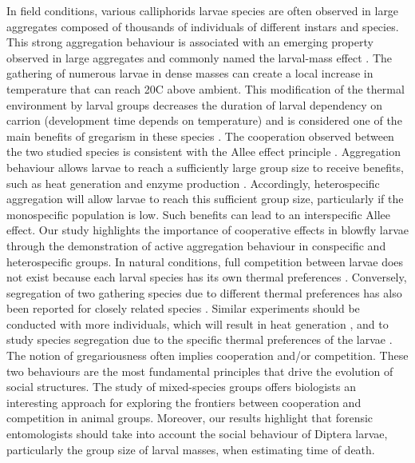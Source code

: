 In field conditions, various calliphorids larvae species are often observed in large aggregates composed of thousands of individuals of different instars and species. This strong aggregation behaviour is associated with an emerging property observed in large aggregates and commonly named the larval-mass effect \citep{charabidze_larval-mass_2011,slone_thermoregulation_2007}. The gathering of numerous larvae in dense masses can create a local increase in temperature that can reach 20C above ambient. This modification of the thermal environment by larval groups decreases the duration of larval dependency on carrion (development time depends on temperature) and is considered one of the main benefits of gregarism in these species \cite{rivers_physiological_2011}. The cooperation observed between the two studied species is consistent with the Allee effect principle \cite{courchamp_allee_2008}. Aggregation behaviour allows larvae to reach a sufficiently large group size to receive benefits, such as heat generation and enzyme production \cite{rivers_physiological_2011}. Accordingly, heterospecific aggregation will allow larvae to reach this sufficient group size, particularly if the monospecific population is low. Such benefits can lead to an interspecific Allee effect. Our study highlights the importance of cooperative effects in blowfly larvae through the demonstration of active aggregation behaviour in conspecific and heterospecific groups. In natural conditions, full competition between larvae does not exist because each larval species has its own thermal preferences \cite{villet_contemporary_2010}. Conversely, segregation of two gathering species due to different thermal preferences has also been reported for closely related species \cite{villet_contemporary_2010}. Similar experiments should be conducted with more individuals, which will result in heat generation \cite{heaton_quantifying_2014}, and to study species segregation due to the specific thermal preferences of the larvae \cite{villet_contemporary_2010}. The notion of gregariousness often implies cooperation and/or competition. These two behaviours are the most fundamental principles that drive the evolution of social structures. The study of mixed-species groups offers biologists an interesting approach for exploring the frontiers between cooperation and competition in animal groups. Moreover, our results highlight that forensic entomologists should take into account the social behaviour of Diptera larvae, particularly the group size of larval masses, when estimating time of death.


